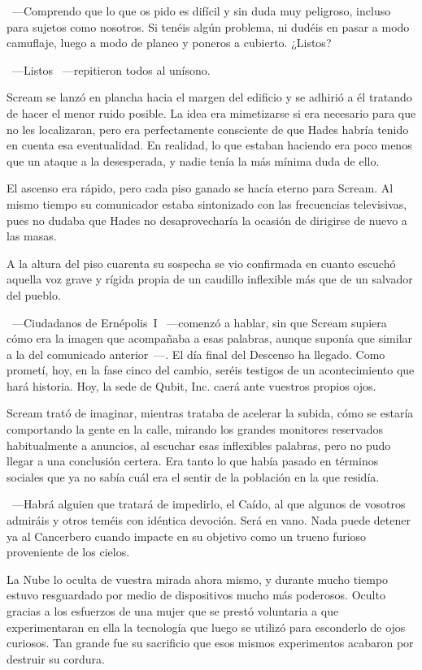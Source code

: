 ~---Comprendo que lo que os pido es difícil y sin duda muy peligroso, incluso para sujetos como nosotros. Si tenéis algún problema, ni dudéis en pasar a modo camuflaje, luego a modo de planeo y poneros a cubierto. ¿Listos?

~---Listos ~---repitieron todos al unísono.

Scream se lanzó en plancha hacia el margen del edificio y se adhirió a él tratando de hacer el menor ruido posible. La idea era mimetizarse si era necesario para que no les localizaran, pero era perfectamente consciente de que Hades habría tenido en cuenta esa eventualidad. En realidad, lo que estaban haciendo era poco menos que un ataque a la desesperada, y nadie tenía la más mínima duda de ello.

El ascenso era rápido, pero cada piso ganado se hacía eterno para Scream. Al mismo tiempo su comunicador estaba sintonizado con las frecuencias televisivas, pues no dudaba que Hades no desaprovecharía la ocasión de dirigirse de nuevo a las masas.

A la altura del piso cuarenta su sospecha se vio confirmada en cuanto escuchó aquella voz grave y rígida propia de un caudillo inflexible más que de un salvador del pueblo.

~---Ciudadanos de Ernépolis~I ~---comenzó a hablar, sin que Scream supiera cómo era la imagen que acompañaba a esas palabras, aunque suponía que similar a la del comunicado anterior~---. El día final del Descenso ha llegado. Como prometí, hoy, en la fase cinco del cambio, seréis testigos de un acontecimiento que hará historia. Hoy, la sede de Qubit, Inc. caerá ante vuestros propios ojos.

Scream trató de imaginar, mientras trataba de acelerar la subida, cómo se estaría comportando la gente en la calle, mirando los grandes monitores reservados habitualmente a anuncios, al escuchar esas inflexibles palabras, pero no pudo llegar a una conclusión certera. Era tanto lo que había pasado en términos sociales que ya no sabía cuál era el sentir de la población en la que residía.

~---Habrá alguien que tratará de impedirlo, el Caído, al que algunos de vosotros admiráis y otros teméis con idéntica devoción. Será en vano. Nada puede detener ya al Cancerbero cuando impacte en su objetivo como un trueno furioso proveniente de los cielos.

\rquoti La Nube lo oculta de vuestra mirada ahora mismo, y durante mucho tiempo estuvo resguardado por medio de dispositivos mucho más poderosos. Oculto gracias a los esfuerzos de una mujer que se prestó voluntaria a que experimentaran en ella la tecnología que luego se utilizó para esconderlo de ojos curiosos. Tan grande fue su sacrificio que esos mismos experimentos acabaron por destruir su cordura.

